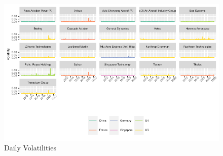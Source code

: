 \documentclass[
  letterpaper,
  DIV=11,
  numbers=noendperiod]{scrartcl}
\begin{document}
\begin{figure}[H]

{\centering \includegraphics{defence_files/figure-pdf/fig-vols-1.pdf}

}

\caption{\label{fig-vols}Daily Volatilities}

\end{figure}
\end{document}
